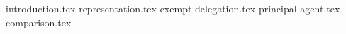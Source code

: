 {introduction.tex}
{representation.tex}
{exempt-delegation.tex}
{principal-agent.tex}
{comparison.tex}
